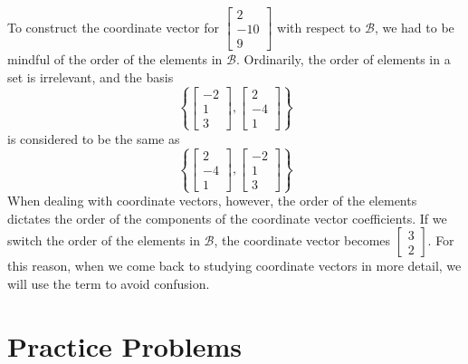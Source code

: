 \documentclass{ximera}
\begin{document}
\begin{example}
\begin{explanation}
 \begin{remark}
 To construct the coordinate vector for $\begin{bmatrix}2\\-10\\9\end{bmatrix}$ with respect to $\mathcal{B}$, we had to be mindful of the order of the elements in $\mathcal{B}$.  Ordinarily, the order of elements in a set is irrelevant, and the basis $$\left\{\begin{bmatrix}-2\\1\\3\end{bmatrix},\begin{bmatrix}2\\-4\\1\end{bmatrix}\right\}$$ is considered to be the same as $$\left\{\begin{bmatrix}2\\-4\\1\end{bmatrix},\begin{bmatrix}-2\\1\\3\end{bmatrix}\right\}$$ When dealing with coordinate vectors, however, the order of the elements dictates the order of the components of the coordinate vector coefficients.  If we switch the order of the elements in $\mathcal{B}$, the coordinate vector becomes $\begin{bmatrix}3\\2\end{bmatrix}$.  For this reason, when we come back to studying coordinate vectors in more detail, we will use the term  to avoid confusion.
 \end{remark}
 
\end{explanation}
\end{example}


\section*{Practice Problems}
\end{document}
